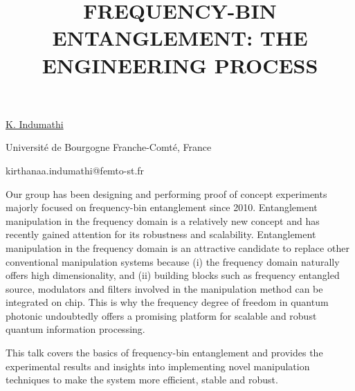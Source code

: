 \title{FREQUENCY-BIN ENTANGLEMENT: THE ENGINEERING PROCESS}

\underline{K. Indumathi}  

{\normalsize{\vspace{-4mm}
Université de Bourgogne Franche-Comté, France



\email kirthanaa.indumathi@femto-st.fr}}

Our group has been designing and performing proof of concept experiments majorly focused on
frequency-bin entanglement since 2010. Entanglement manipulation in the frequency domain is a
relatively new concept and has recently gained attention for its robustness and scalability.
Entanglement manipulation in the frequency domain is an attractive candidate to replace other
conventional manipulation systems because (i) the frequency domain naturally offers high
dimensionality, and (ii) building blocks such as frequency entangled source, modulators and filters
involved in the manipulation method can be integrated on chip. This is why the frequency degree of
freedom in quantum photonic undoubtedly offers a promising platform for scalable and robust quantum
information processing.

This talk covers the basics of frequency-bin entanglement and provides the experimental results and
insights into implementing novel manipulation techniques to make the system more efficient, stable and
robust.

\vspace{\baselineskip}
